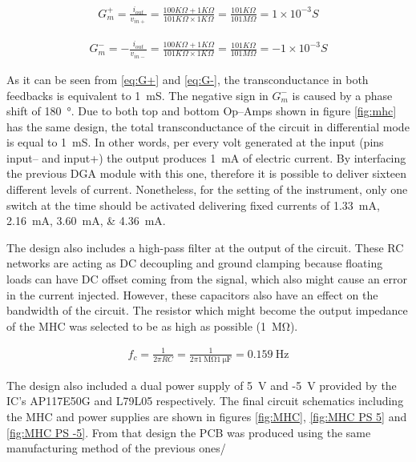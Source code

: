 \begin{align}
\label{eq:G+}
G^+_m=\frac{i_{out}}{v_{in+}}=\frac{100K\Omega + 1K\Omega}{101K\Omega \times 1K\Omega}=\frac{101K\Omega}{101M\Omega}=1\times10^{-3}S 
\end{align}

\begin{align}
\label{eq:G-}
G^-_m=-\frac{i_{out}}{v_{in-}}=\frac{100K\Omega + 1K\Omega}{101K\Omega \times 1K\Omega}=\frac{101K\Omega}{101M\Omega}=-1\times10^{-3}S 
\end{align}

As it can be seen from \ref{eq:G+} and \ref{eq:G-}, the transconductance in both feedbacks is equivalent to \SI{1}{\milli\siemens}. The negative sign in $G^{-}_m$ is caused by a phase shift of \SI{180}{\degree}. Due to both top and bottom Op–Amps shown in figure \ref{fig:mhc} has the same design, the total transconductance of the circuit in differential mode is equal to \SI{1}{\milli\siemens}. In other words, per every volt generated at the input (pins input– and input+) the output produces \SI{1}{\mA} of electric current. By interfacing the previous DGA module with this one, therefore it is possible to deliver sixteen different levels of current. Nonetheless, for the setting of the instrument, only one switch at the time should be activated delivering fixed currents of \SIlist{1.33;2.16;3.60;4.36}{\mA}.

The design also includes a high-pass filter at the output of the circuit. These RC networks are acting as DC decoupling and ground clamping because floating loads can have DC offset coming from the signal, which also might cause an error in the current injected. However, these capacitors also have an effect on the bandwidth of the circuit. The resistor which might become the output impedance of the MHC was selected to be as high as possible (\SI{1}{\mega\ohm}).

\begin{align}
	\label{eq:MHC filter}
	f_c = \frac{1}{2 \pi R C} = \frac{1}{2 \pi \SI{1}{\mega\ohm} \SI{1}{\micro\farad}} = \SI{0.159}{\hertz}
\end{align}

The design also included a dual power supply of \SI{5}{\volt} and -\SI{5}{\volt} provided by the IC's AP117E50G and L79L05 respectively. The final circuit schematics including the MHC and power supplies are shown in figures \ref{fig:MHC}, \ref{fig:MHC PS 5} and \ref{fig:MHC PS -5}. From that design the PCB was produced using the same manufacturing method of the previous ones/


